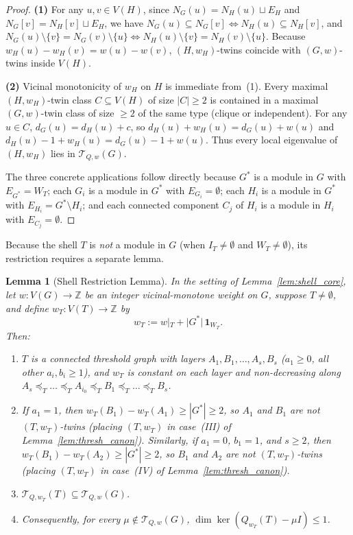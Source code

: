 \documentclass[11pt,a4paper]{article}
\newtheorem{lemma}[theorem]{Lemma}
\theoremstyle{definition}
\begin{document}
\begin{proof}
  \textbf{(1)} For any $u, v \in V(H)$, since $N_G(u) = N_H(u) \sqcup E_H$ and $N_G[v] = N_H[v] \sqcup E_H$, we have $N_G(u) \subseteq N_G[v] \iff N_H(u) \subseteq N_H[v]$, and $N_G(u)\setminus\{v\} = N_G(v)\setminus\{u\} \iff N_H(u)\setminus\{v\} = N_H(v)\setminus\{u\}$. Because $w_H(u) - w_H(v) = w(u) - w(v)$, $(H, w_H)$-twins coincide with $(G, w)$-twins inside $V(H)$.

  \textbf{(2)} Vicinal monotonicity of $w_H$ on $H$ is immediate from~(1). Every maximal $(H, w_H)$-twin class $C \subseteq V(H)$ of size $|C| \ge 2$ is contained in a maximal $(G, w)$-twin class of size $\ge 2$ of the same type (clique or independent). For any $u \in C$, $d_G(u) = d_H(u) + c$, so $d_H(u) + w_H(u) = d_G(u) + w(u)$ and $d_H(u) - 1 + w_H(u) = d_G(u) - 1 + w(u)$. Thus every local eigenvalue of $(H, w_H)$ lies in $\mathcal{T}_{Q,w}(G)$.

  The three concrete applications follow directly because $G^*$ is a module in $G$ with $E_{G^*} = W_T$; each $G_i$ is a module in $G^*$ with $E_{G_i} = \emptyset$; each $H_i$ is a module in $G^*$ with $E_{H_i} = G^* \setminus H_i$; and each connected component $C_j$ of $H_i$ is a module in $H_i$ with $E_{C_j} = \emptyset$.
\end{proof}

Because the shell $T$ is \emph{not} a module in $G$ (when $I_T \ne \emptyset$ and $W_T \ne \emptyset$), its restriction requires a separate lemma.

\begin{lemma}[Shell Restriction Lemma]\label{lem:shell_restrict}
  In the setting of Lemma~\ref{lem:shell_core}, let $w : V(G) \to \mathbb{Z}$ be an integer vicinal-monotone weight on $G$, suppose $T \ne \emptyset$, and define $w_T : V(T) \to \mathbb{Z}$ by
  \[
    w_T := w|_T + |G^*|\,\mathbf{1}_{W_T}.
  \]
  Then:
  \begin{enumerate}
    \item $T$ is a connected threshold graph with layers $A_1, B_1, \dots, A_s, B_s$ ($a_1 \ge 0$, all other $a_i, b_i \ge 1$), and $w_T$ is constant on each layer and non-decreasing along $A_s \preceq_T \dots \preceq_T A_{i_0} \preceq_T B_1 \preceq_T \dots \preceq_T B_s$.
    \item If $a_1 = 1$, then $w_T(B_1) - w_T(A_1) \ge |G^*| \ge 2$, so $A_1$ and $B_1$ are \emph{not} $(T, w_T)$-twins (placing $(T, w_T)$ in case~(III) of Lemma~\ref{lem:thresh_canon}). Similarly, if $a_1 = 0$, $b_1 = 1$, and $s \ge 2$, then $w_T(B_1) - w_T(A_2) \ge |G^*| \ge 2$, so $B_1$ and $A_2$ are \emph{not} $(T, w_T)$-twins (placing $(T, w_T)$ in case~(IV) of Lemma~\ref{lem:thresh_canon}).
    \item $\mathcal{T}_{Q, w_T}(T) \subseteq \mathcal{T}_{Q, w}(G)$.
    \item Consequently, for every $\mu \notin \mathcal{T}_{Q, w}(G)$, $\dim\ker(Q_{w_T}(T) - \mu I) \le 1$.
  \end{enumerate}
\end{lemma}
\end{document}

